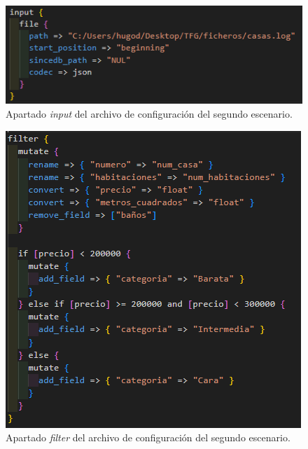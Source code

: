 \begin{figure}
    \centering
    \includegraphics[width=1\linewidth]{img/input2.png}
    \caption{Apartado \textit{input} del archivo de configuración del segundo escenario.}
    \label{fig:input2}
\end{figure}

\begin{figure}
    \centering
    \includegraphics[width=1\linewidth]{img/filter2.png}
    \caption{Apartado \textit{filter} del archivo de configuración del segundo escenario.}
    \label{fig:filter2}
\end{figure}

